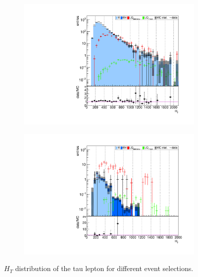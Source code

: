 \begin{figure}
\begin{subfigure}[t]{0.49\textwidth}
                \end{subfigure}
                \begin{subfigure}[t]{0.49\textwidth}
                \includegraphics[width=\textwidth]{figures/plots/kinLQ75/HT_2j1b_1tau.pdf}
                \label{HT:1b1tau}
                \end{subfigure}
                \begin{subfigure}[t]{0.49\textwidth}
                \includegraphics[width=\textwidth]{figures/plots/kinLQ75/HT_2j1b_2tau.pdf}
                \label{HT:1b2tau}
                \end{subfigure}
\caption[$H_T$ distribution of the tau lepton for different event selections.]{$H_T$ distribution of the tau lepton for different event selections.}
\label{HT}
\end{figure}
